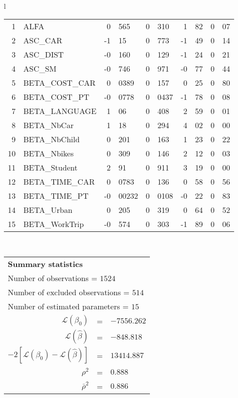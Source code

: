 \begin{tabular}{l}
\begin{tabular}{rlr@{.}lr@{.}lr@{.}lr@{.}l}
1 & ALFA & 0&565 & 0&310 & 1&82 & 0&07\\
2 & ASC_CAR & -1&15 & 0&773 & -1&49 & 0&14\\
3 & ASC_DIST & -0&160 & 0&129 & -1&24 & 0&21\\
4 & ASC_SM & -0&746 & 0&971 & -0&77 & 0&44\\
5 & BETA_COST_CAR & 0&0389 & 0&157 & 0&25 & 0&80\\
6 & BETA_COST_PT & -0&0778 & 0&0437 & -1&78 & 0&08\\
7 & BETA_LANGUAGE & 1&06 & 0&408 & 2&59 & 0&01\\
8 & BETA_NbCar & 1&18 & 0&294 & 4&02 & 0&00\\
9 & BETA_NbChild & 0&201 & 0&163 & 1&23 & 0&22\\
10 & BETA_Nbikes & 0&309 & 0&146 & 2&12 & 0&03\\
11 & BETA_Student & 2&91 & 0&911 & 3&19 & 0&00\\
12 & BETA_TIME_CAR & 0&0783 & 0&136 & 0&58 & 0&56\\
13 & BETA_TIME_PT & -0&00232 & 0&0108 & -0&22 & 0&83\\
14 & BETA_Urban & 0&205 & 0&319 & 0&64 & 0&52\\
15 & BETA_WorkTrip & -0&574 & 0&303 & -1&89 & 0&06\\
\hline
\end{tabular}
\\
\begin{tabular}{rcl}
\multicolumn{3}{l}{\bf Summary statistics}\\
\multicolumn{3}{l}{ Number of observations = $1524$} \\
\multicolumn{3}{l}{ Number of excluded observations = $514$} \\
\multicolumn{3}{l}{ Number of estimated  parameters = $15$} \\
 $\mathcal{L}(\beta_0)$ &=&  $-7556.262$ \\
 $\mathcal{L}(\hat{\beta})$ &=& $-848.818 $  \\
 $-2[\mathcal{L}(\beta_0) -\mathcal{L}(\hat{\beta})]$ &=& $13414.887$ \\
    $\rho^2$ &=&   $0.888$ \\
    $\bar{\rho}^2$ &=&    $0.886$ \\
\end{tabular}
  \end{tabular}
